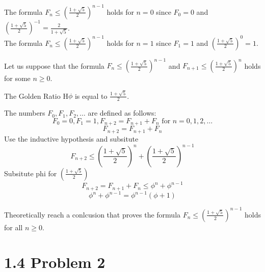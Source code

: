 \documentclass{report}
\begin{document}
\begin{basecaseWithPoppy}
    The formula $F_{n} \leq \left(\frac{1 + \sqrt{5}}{2}\right)^{n-1}$ holds for \( n = 0 \) since \( F_{0} = 0 \) and \( \left(\frac{1 + \sqrt{5}}{2}\right)^{-1} = \frac{2}{1 + \sqrt{5}} \).  \\
    The formula $F_{n} \leq \left(\frac{1 + \sqrt{5}}{2}\right)^{n-1}$ holds for \( n = 1 \) since \( F_{1} = 1 \) and \( \left(\frac{1 + \sqrt{5}}{2}\right)^{0} = 1 \). 
\end{basecaseWithPoppy}

\begin{inducthypWithRose}
    Let us suppose that the formula $F_{n} \leq \left(\frac{1 + \sqrt{5}}{2}\right)^{n-1}$ and $F_{n+1} \leq \left(\frac{1 + \sqrt{5}}{2}\right)^{n}$ holds for some \( n \geq 0 \).
\end{inducthypWithRose}    

\begin{RemarkWithLily}{The Golden Ratio}
   H$\phi$ is equal to $\frac{1 + \sqrt{5}}{2}$.    
\end{RemarkWithLily}

\begin{inductstepWithTulip}

    The numbers $F_{0}, F_{1}, F_{2}, \ldots$ are defined as follows:
        \[ F_{0} = 0, F_{1} = 1, F_{n+2} = F_{n+1} + F_{n} \text{ for } n = 0,1,2, \ldots \]
    \[ F_{n + 2} = F_{n+1} + F_{n} \]
    Use the inductive hypothesis and subsitute  
    \[ F_{n + 2} \leq \left(\frac{1 + \sqrt{5}}{2}\right)^{n} + \left(\frac{1 + \sqrt{5}}{2}\right)^{n-1}\]     
    Subsitute phi for \(\left(\frac{1 + \sqrt{5}}{2}\right)\)
    \[ F_{n + 2} = F_{n+1} + F_{n} \leq \phi^{n} + \phi^{n-1}\] 
    \[ \phi^{n}+ \phi^{n-1} = \phi^{n-1}(\phi + 1) \] 

\end{inductstepWithTulip}

\begin{keyideaWithLotus}
    Theoretically reach a conlcusion that proves the formula $F_{n} \leq \left(\frac{1 + \sqrt{5}}{2}\right)^{n-1}$ holds for all \( n \geq 0 \).
\end{keyideaWithLotus}


\section*{1.4 Problem 2}

\end{document}
